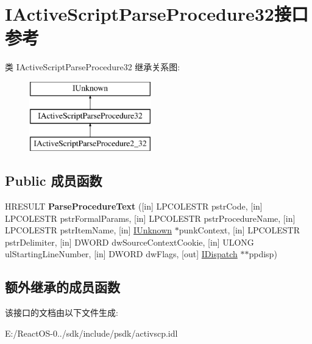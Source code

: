 \hypertarget{interface_i_active_script_parse_procedure32}{}\section{I\+Active\+Script\+Parse\+Procedure32接口 参考}
\label{interface_i_active_script_parse_procedure32}
类 I\+Active\+Script\+Parse\+Procedure32 继承关系图\+:\begin{figure}[H]
\begin{center}
\leavevmode
\includegraphics[height=3.000000cm]{interface_i_active_script_parse_procedure32}
\end{center}
\end{figure}
\subsection*{Public 成员函数}
\begin{DoxyCompactItemize}
\item 
\mbox{\label{interface_i_active_script_parse_procedure32_a338d9398ed6584f7f521789f56e538c1}} 
H\+R\+E\+S\+U\+LT {\bfseries Parse\+Procedure\+Text} (\mbox{[}in\mbox{]} L\+P\+C\+O\+L\+E\+S\+TR pstr\+Code, \mbox{[}in\mbox{]} L\+P\+C\+O\+L\+E\+S\+TR pstr\+Formal\+Params, \mbox{[}in\mbox{]} L\+P\+C\+O\+L\+E\+S\+TR pstr\+Procedure\+Name, \mbox{[}in\mbox{]} L\+P\+C\+O\+L\+E\+S\+TR pstr\+Item\+Name, \mbox{[}in\mbox{]} \hyperlink{interface_i_unknown}{I\+Unknown} $\ast$punk\+Context, \mbox{[}in\mbox{]} L\+P\+C\+O\+L\+E\+S\+TR pstr\+Delimiter, \mbox{[}in\mbox{]} D\+W\+O\+RD dw\+Source\+Context\+Cookie, \mbox{[}in\mbox{]} U\+L\+O\+NG ul\+Starting\+Line\+Number, \mbox{[}in\mbox{]} D\+W\+O\+RD dw\+Flags, \mbox{[}out\mbox{]} \hyperlink{interface_i_dispatch}{I\+Dispatch} $\ast$$\ast$ppdisp)
\end{DoxyCompactItemize}
\subsection*{额外继承的成员函数}


该接口的文档由以下文件生成\+:\begin{DoxyCompactItemize}
\item 
E\+:/\+React\+O\+S-\/0../sdk/include/psdk/activscp.\+idl\end{DoxyCompactItemize}
